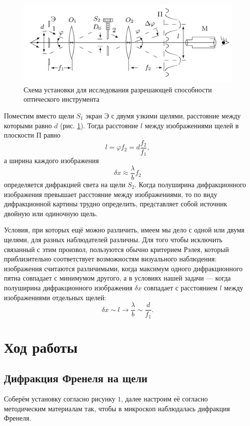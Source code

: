 \documentclass[a4paper,12pt]{article}
\begin{document}
\begin{figure}[H]
	\centering
	\includegraphics[scale=0.15]{dlab.jpeg}
	\caption{Схема установки для исследования разрешающей
		способности оптического инструмента}
	\label{labG}
\end{figure}

Поместим вместо щели $S_1$ экран Э с двумя узкими щелями, расстояние между которыми равно $d$ (рис. \ref{labG}). Тогда расстояние $l$ между изображениями щелей в плоскости П равно
\begin{equation}
l = \varphi f_2 = d \dfrac{f_2}{f_1},
\end{equation}
а ширина каждого изображения
\begin{equation}
\delta x \approx \dfrac{\lambda}{b} f_2
\end{equation}
определяется дифракцией света на щели $S_2$. Когда полуширина дифракционного изображения превышает расстояние между изображениями, то по виду дифракционной картины трудно определить, представляет собой источник двойную или одиночную щель.

Условия, при которых ещё можно различить, имеем мы дело с одной или двумя щелями, для разных наблюдателей различны. Для того чтобы исключить связанный с этим произвол, пользуются обычно критерием Рэлея, который приблизительно соответствует возможностям визуального наблюдения: изображения считаются различимыми, когда максимум одного дифракционного пятна совпадает с минимумом другого, а в условиях нашей задачи --- когда полуширина дифракционного изображения $\delta x$ совпадает с расстоянием $l$ между изображениями отдельных щелей:
\begin{equation}
\delta x \sim l \to \dfrac{\lambda}{b} \sim \dfrac{d}{f_1}.
\end{equation}

\section{Ход работы}
\subsection{Дифракция Френеля на щели}
Соберём установку согласно рисунку $1$, далее настроим её согласно методическим материалам так, чтобы в микроскоп наблюдалась дифракция Френеля.
\end{document}

